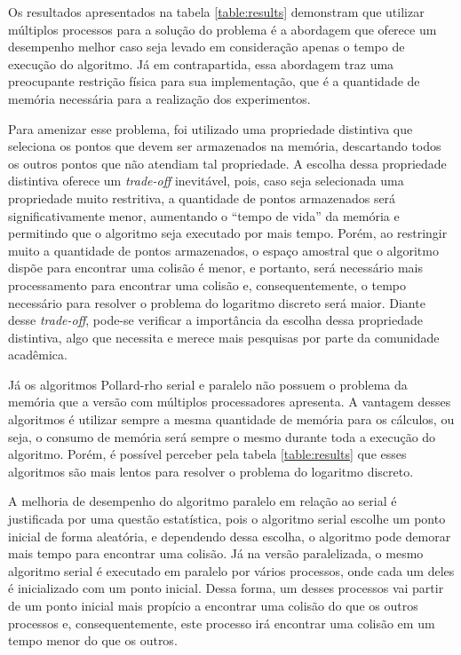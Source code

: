 Os resultados apresentados na tabela \ref{table:results} demonstram que utilizar múltiplos processos para a solução do problema é a abordagem que oferece um desempenho melhor caso seja levado em consideração apenas o tempo de execução do algoritmo. Já em contrapartida, essa abordagem traz uma preocupante restrição física para sua implementação, que é a quantidade de memória necessária para a realização dos experimentos.

Para amenizar esse problema, foi utilizado uma propriedade distintiva que seleciona os pontos que devem ser armazenados na memória, descartando todos os outros pontos que não atendiam tal propriedade. A escolha dessa propriedade distintiva oferece um \textit{trade-off} inevitável, pois, caso seja selecionada uma propriedade muito restritiva, a quantidade de pontos armazenados será significativamente menor, aumentando o ``tempo de vida'' da memória e permitindo que o algoritmo seja executado por mais tempo. Porém, ao restringir muito a quantidade de pontos armazenados, o espaço amostral que o algoritmo dispõe para encontrar uma colisão é menor, e portanto, será necessário mais processamento para encontrar uma colisão e, consequentemente, o tempo necessário para resolver o problema do logaritmo discreto será maior. Diante desse \textit{trade-off}, pode-se verificar a importância da escolha dessa propriedade distintiva, algo que necessita e merece mais pesquisas por parte da comunidade acadêmica.

Já os algoritmos Pollard-rho serial e paralelo não possuem o problema da memória que a versão com múltiplos processadores apresenta. A vantagem desses algoritmos é utilizar sempre a mesma quantidade de memória para os cálculos, ou seja, o consumo de memória será sempre o mesmo durante toda a execução do algoritmo. Porém, é possível perceber pela tabela \ref{table:results} que esses algoritmos são mais lentos para resolver o problema do logaritmo discreto.

A melhoria de desempenho do algoritmo paralelo em relação ao serial é justificada por uma questão estatística, pois o algoritmo serial escolhe um ponto inicial de forma aleatória, e dependendo dessa escolha, o algoritmo pode demorar mais tempo para encontrar uma colisão. Já na versão paralelizada, o mesmo algoritmo serial é executado em paralelo por vários processos, onde cada um deles é inicializado com um ponto inicial. Dessa forma, um desses processos vai partir de um ponto inicial mais propício a encontrar uma colisão do que os outros processos e, consequentemente, este processo irá encontrar uma colisão em um tempo menor do que os outros.

